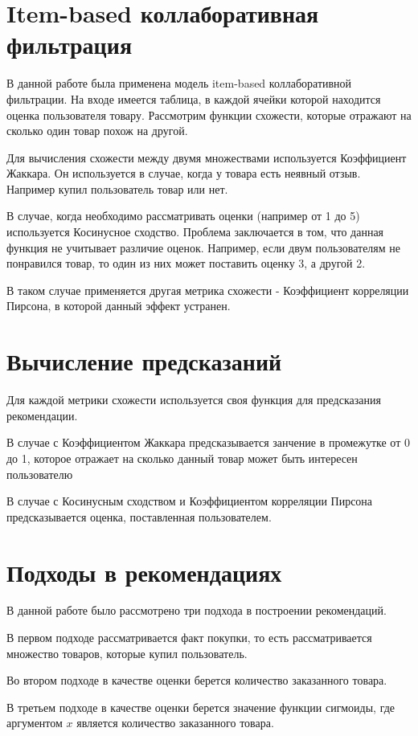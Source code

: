 \documentclass{fefu}
\begin{document}
  \section{Item-based коллаборативная фильтрация}
  В данной работе была применена модель item-based коллаборативной фильтрации.
  На входе имеется таблица, в каждой ячейки которой находится оценка пользователя товару.
  Рассмотрим функции схожести, которые отражают на сколько один товар похож на другой.

  Для вычисления схожести между двумя множествами используется Коэффициент Жаккара.
  Он используется в случае, когда у товара есть неявный отзыв. Например купил
  пользователь товар или нет.

  В случае, когда необходимо рассматривать оценки (например от 1 до 5) используется
  Косинусное сходство. Проблема заключается в том, что данная функция не учитывает
  различие оценок. Например, если двум пользователям не понравился товар, то один
  из них может поставить оценку 3, а другой 2.

  В таком случае применяется другая метрика схожести - Коэффициент корреляции
  Пирсона, в которой данный эффект устранен.

  \section{Вычисление предсказаний}
  Для каждой метрики схожести используется своя функция для предсказания рекомендации.

  В случае с Коэффициентом Жаккара предсказывается занчение в промежутке от 0 до 1,
  которое отражает на сколько данный товар может быть интересен пользователю

  В случае с Косинусным сходством и Коэффициентом корреляции Пирсона предсказывается
  оценка, поставленная пользователем.

  \section{Подходы в рекомендациях}
  В данной работе было рассмотрено три подхода в построении рекомендаций.

  В первом подходе рассматривается факт покупки, то есть рассматривается множество
  товаров, которые купил пользователь.

  Во втором подходе в качестве оценки берется количество заказанного товара.

  В третьем подходе в качестве оценки берется значение функции сигмоиды, где аргументом
  $x$ является количество заказанного товара.
\end{document}
